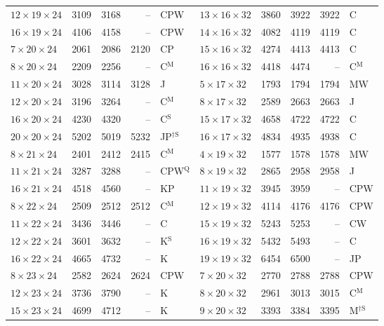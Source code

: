 \begin{longtable}{@{}lrrrl@{\hspace{6mm}}lrrrl@{}}
$12{\times}19{\times}24$ & 3109 & 3168 & -- & CPW & $13{\times}16{\times}32$ & 3860 & 3922 & 3922 & C\\
$16{\times}19{\times}24$ & 4106 & 4158 & -- & CPW & $14{\times}16{\times}32$ & 4082 & 4119 & 4119 & C\\
$7{\times}20{\times}24$ & 2061 & 2086 & 2120 & CP & $15{\times}16{\times}32$ & 4274 & 4413 & 4413 & C\\
$8{\times}20{\times}24$ & 2209 & 2256 & -- & C$^{\mathrm{M}}$ & $16{\times}16{\times}32$ & 4418 & 4474 & -- & C$^{\mathrm{M}}$\\
$11{\times}20{\times}24$ & 3028 & 3114 & 3128 & J & $5{\times}17{\times}32$ & 1793 & 1794 & 1794 & MW\\
$12{\times}20{\times}24$ & 3196 & 3264 & -- & C$^{\mathrm{M}}$ & $8{\times}17{\times}32$ & 2589 & 2663 & 2663 & J\\
$16{\times}20{\times}24$ & 4230 & 4320 & -- & C$^{\mathrm{S}}$ & $15{\times}17{\times}32$ & 4658 & 4722 & 4722 & C\\
$20{\times}20{\times}24$ & 5202 & 5019 & 5232 & JP$^{\dagger\mathrm{S}}$ & $16{\times}17{\times}32$ & 4834 & 4935 & 4938 & C\\
$8{\times}21{\times}24$ & 2401 & 2412 & 2415 & C$^{\mathrm{M}}$ & $4{\times}19{\times}32$ & 1577 & 1578 & 1578 & MW\\
$11{\times}21{\times}24$ & 3287 & 3288 & -- & CPW$^{\mathrm{Q}}$ & $8{\times}19{\times}32$ & 2865 & 2958 & 2958 & J\\
$16{\times}21{\times}24$ & 4518 & 4560 & -- & KP & $11{\times}19{\times}32$ & 3945 & 3959 & -- & CPW\\
$8{\times}22{\times}24$ & 2509 & 2512 & 2512 & C$^{\mathrm{M}}$ & $12{\times}19{\times}32$ & 4114 & 4176 & 4176 & CPW\\
$11{\times}22{\times}24$ & 3436 & 3446 & -- & C & $15{\times}19{\times}32$ & 5243 & 5253 & -- & CW\\
$12{\times}22{\times}24$ & 3601 & 3632 & -- & K$^{\mathrm{S}}$ & $16{\times}19{\times}32$ & 5432 & 5493 & -- & C\\
$16{\times}22{\times}24$ & 4665 & 4732 & -- & K & $19{\times}19{\times}32$ & 6454 & 6500 & -- & JP\\
$8{\times}23{\times}24$ & 2582 & 2624 & 2624 & CPW & $7{\times}20{\times}32$ & 2770 & 2788 & 2788 & CPW\\
$12{\times}23{\times}24$ & 3736 & 3790 & -- & K & $8{\times}20{\times}32$ & 2961 & 3013 & 3015 & C$^{\mathrm{M}}$\\
$15{\times}23{\times}24$ & 4699 & 4712 & -- & K & $9{\times}20{\times}32$ & 3393 & 3384 & 3395 & M$^{\dagger\mathrm{S}}$\\

\end{longtable}
